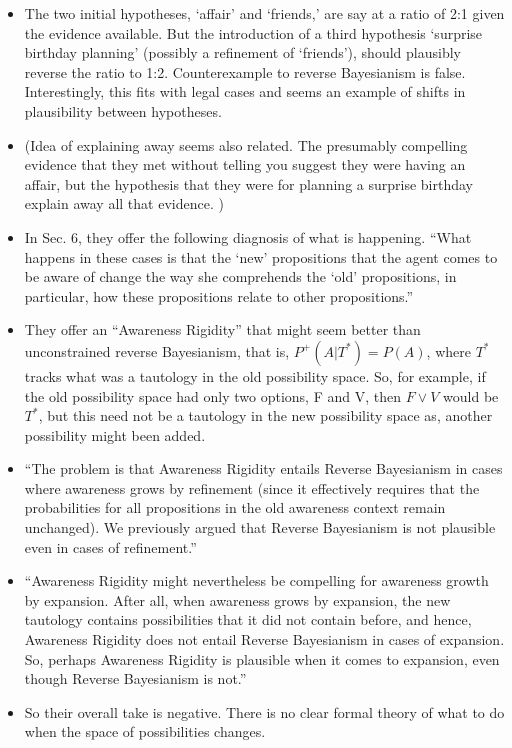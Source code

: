 \documentclass[
  11pt,
  dvipsnames,enabledeprecatedfontcommands]{scrartcl}
\begin{document}
\begin{itemize}
\item
  The two initial hypotheses, `affair' and `friends,' are say at a ratio
  of 2:1 given the evidence available. But the introduction of a third
  hypothesis `surprise birthday planning' (possibly a refinement of
  `friends'), should plausibly reverse the ratio to 1:2. Counterexample
  to reverse Bayesianism is false. Interestingly, this fits with legal
  cases and seems an example of shifts in plausibility between
  hypotheses.
\item
  (Idea of explaining away seems also related. The presumably compelling
  evidence that they met without telling you suggest they were having an
  affair, but the hypothesis that they were for planning a surprise
  birthday explain away all that evidence. )
\item
  In Sec. 6, they offer the following diagnosis of what is happening.
  ``What happens in these cases is that the `new' propositions that the
  agent comes to be aware of change the way she comprehends the `old'
  propositions, in particular, how these propositions relate to other
  propositions.''
\item
  They offer an ``Awareness Rigidity'' that might seem better than
  unconstrained reverse Bayesianism, that is, \(P^+(A \vert T^*)=P(A)\),
  where \(T^*\) tracks what was a tautology in the old possibility
  space. So, for example, if the old possibility space had only two
  options, F and V, then \(F\vee V\) would be \(T^*\), but this need not
  be a tautology in the new possibility space as, another possibility
  might been added.
\item
  ``The problem is that Awareness Rigidity entails Reverse Bayesianism
  in cases where awareness grows by refinement (since it effectively
  requires that the probabilities for all propositions in the old
  awareness context remain unchanged). We previously argued that Reverse
  Bayesianism is not plausible even in cases of refinement.''
\item
  ``Awareness Rigidity might nevertheless be compelling for awareness
  growth by expansion. After all, when awareness grows by expansion, the
  new tautology contains possibilities that it did not contain before,
  and hence, Awareness Rigidity does not entail Reverse Bayesianism in
  cases of expansion. So, perhaps Awareness Rigidity is plausible when
  it comes to expansion, even though Reverse Bayesianism is not.''
\item
  So their overall take is negative. There is no clear formal theory of
  what to do when the space of possibilities changes.
\end{itemize}
\end{document}
